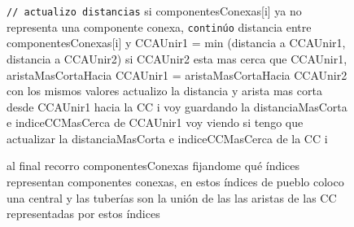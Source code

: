\documentclass[11pt, a4paper, twoside]{article}
\begin{document}
\begin{figure}
\begin{algorithm}[H]
\begin{algorithmic}[1]
	\Statex \hspace{0.5cm} \texttt{// actualizo distancias}
	  
		\State si componentesConexas[i] ya no representa una componente conexa, \texttt{continúo}  
		\State distancia entre componentesConexas[i] y CCAUnir1 = min (distancia a CCAUnir1, distancia a CCAUnir2)  
        \State si CCAUnir2 esta mas cerca que CCAUnir1, aristaMasCortaHacia CCAUnir1 = aristaMasCortaHacia CCAUnir2  
        \State con los mismos valores actualizo la distancia y arista mas corta desde CCAUnir1 hacia la CC i  
        \State voy guardando la distanciaMasCorta e indiceCCMasCerca de CCAUnir1  
        \State voy viendo si tengo que actualizar la distanciaMasCorta e indiceCCMasCerca de la CC i  
	\EndFor
\EndFor 

\State al final recorro componentesConexas fijandome qué índices representan componentes conexas, 
	   en estos índices de pueblo coloco una central y las tuberías son la unión de las las aristas 
	   de las CC representadas por estos índices  


	
\end{algorithmic}
\end{algorithm}
\end{figure}
\end{document}

